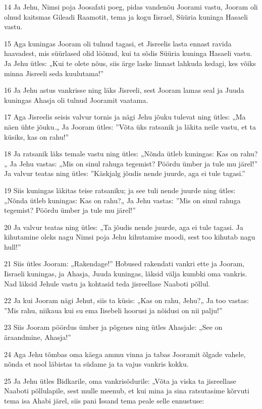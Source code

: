 \par 14 Ja Jehu, Nimsi poja Joosafati poeg, pidas vandenõu Joorami vastu, Jooram oli olnud kaitsmas Gileadi Raamotit, tema ja kogu Iisrael, Süüria kuninga Hasaeli vastu.
\par 15 Aga kuningas Jooram oli tulnud tagasi, et Jisreelis lasta ennast ravida haavadest, mis süürlased olid löönud, kui ta sõdis Süüria kuninga Hasaeli vastu. Ja Jehu ütles: „Kui te olete nõus, siis ärge laske linnast lahkuda kedagi, kes võiks minna Jisreeli seda kuulutama!”
\par 16 Ja Jehu astus vankrisse ning läks Jisreeli, sest Jooram lamas seal ja Juuda kuningas Ahasja oli tulnud Jooramit vaatama.
\par 17 Aga Jisreelis seisis valvur tornis ja nägi Jehu jõuku tulevat ning ütles: „Ma näen ühte jõuku.„ Ja Jooram ütles: ”Võta üks ratsanik ja läkita neile vastu, et ta küsiks, kas on rahu!”
\par 18 Ja ratsanik läks temale vastu ning ütles: „Nõnda ütleb kuningas: Kas on rahu?„ Ja Jehu vastas: „Mis on sinul rahuga tegemist? Pöördu ümber ja tule mu järel!” Ja valvur teatas ning ütles: ”Käskjalg jõudis nende juurde, aga ei tule tagasi.”
\par 19 Siis kuningas läkitas teise ratsaniku; ja see tuli nende juurde ning ütles: „Nõnda ütleb kuningas: Kas on rahu?„ Ja Jehu vastas: ”Mis on sinul rahuga tegemist? Pöördu ümber ja tule mu järel!”
\par 20 Ja valvur teatas ning ütles: „Ta jõudis nende juurde, aga ei tule tagasi. Ja kihutamine oleks nagu Nimsi poja Jehu kihutamise moodi, sest too kihutab nagu hull!”
\par 21 Siis ütles Jooram: „Rakendage!” Hobused rakendati vankri ette ja Jooram, Iisraeli kuningas, ja Ahasja, Juuda kuningas, läksid välja kumbki oma vankris. Nad läksid Jehule vastu ja kohtasid teda jisreellase Naaboti põllul.
\par 22 Ja kui Jooram nägi Jehut, siis ta küsis: „Kas on rahu, Jehu?„ Ja too vastas: ”Mis rahu, niikaua kui su ema Iisebeli hoorusi ja nõidusi on nii palju!”
\par 23 Siis Jooram pöördus ümber ja põgenes ning ütles Ahasjale: „See on äraandmine, Ahasja!”
\par 24 Aga Jehu tõmbas oma käega ammu vinna ja tabas Jooramit õlgade vahele, nõnda et nool läbistas ta südame ja ta vajus vankris kokku.
\par 25 Ja Jehu ütles Bidkarile, oma vankrisõdurile: „Võta ja viska ta jisreellase Naaboti põllulapile, sest mulle meenub, et kui mina ja sina ratsutasime kõrvuti tema isa Ahabi järel, siis pani Issand tema peale selle ennustuse:
